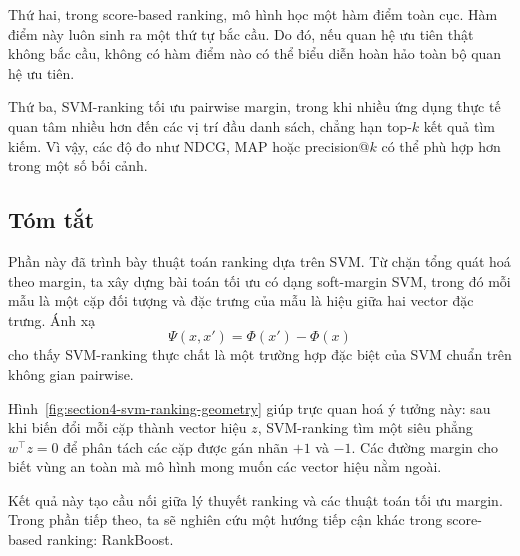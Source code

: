 Thứ hai, trong score-based ranking, mô hình học một hàm điểm toàn cục. Hàm điểm này luôn sinh ra một thứ tự bắc cầu. Do đó, nếu quan hệ ưu tiên thật không bắc cầu, không có hàm điểm nào có thể biểu diễn hoàn hảo toàn bộ quan hệ ưu tiên.

Thứ ba, SVM-ranking tối ưu pairwise margin, trong khi nhiều ứng dụng thực tế quan tâm nhiều hơn đến các vị trí đầu danh sách, chẳng hạn top-\(k\) kết quả tìm kiếm. Vì vậy, các độ đo như NDCG, MAP hoặc precision@\(k\) có thể phù hợp hơn trong một số bối cảnh.

\subsection{Tóm tắt}

Phần này đã trình bày thuật toán ranking dựa trên SVM. Từ chặn tổng quát hoá theo margin, ta xây dựng bài toán tối ưu có dạng soft-margin SVM, trong đó mỗi mẫu là một cặp đối tượng và đặc trưng của mẫu là hiệu giữa hai vector đặc trưng. Ánh xạ
\[
    \Psi(x,x')=\Phi(x')-\Phi(x)
\]
cho thấy SVM-ranking thực chất là một trường hợp đặc biệt của SVM chuẩn trên không gian pairwise.

Hình~\ref{fig:section4-svm-ranking-geometry} giúp trực quan hoá ý tưởng này: sau khi biến đổi mỗi cặp thành vector hiệu \(z\), SVM-ranking tìm một siêu phẳng \(w^\top z=0\) để phân tách các cặp được gán nhãn \(+1\) và \(-1\). Các đường margin cho biết vùng an toàn mà mô hình mong muốn các vector hiệu nằm ngoài.

Kết quả này tạo cầu nối giữa lý thuyết ranking và các thuật toán tối ưu margin. Trong phần tiếp theo, ta sẽ nghiên cứu một hướng tiếp cận khác trong score-based ranking: RankBoost.

